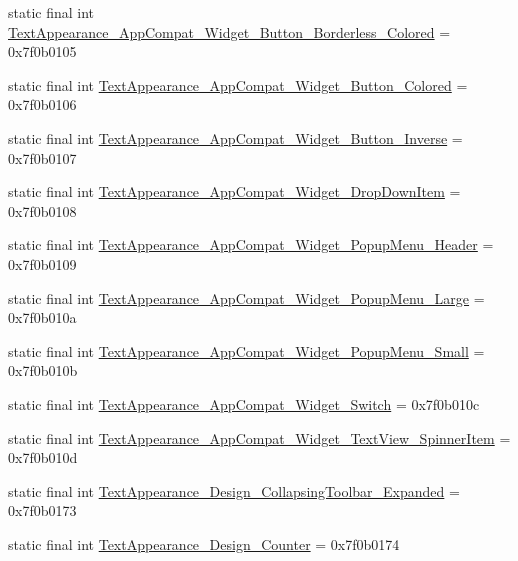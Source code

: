 \begin{CompactItemize}
\item 
static final int \hyperlink{classandroid_1_1support_1_1v7_1_1cardview_1_1_r_1_1style_46c04802bf8bde0a3ba1dcdb5ab0f161}{TextAppearance\_\-AppCompat\_\-Widget\_\-Button\_\-Borderless\_\-Colored} = 0x7f0b0105
\item 
static final int \hyperlink{classandroid_1_1support_1_1v7_1_1cardview_1_1_r_1_1style_08aa6abb9d2c92405c95fcb7412792d5}{TextAppearance\_\-AppCompat\_\-Widget\_\-Button\_\-Colored} = 0x7f0b0106
\item 
static final int \hyperlink{classandroid_1_1support_1_1v7_1_1cardview_1_1_r_1_1style_085db6fb1ccc083bab7230623e091c08}{TextAppearance\_\-AppCompat\_\-Widget\_\-Button\_\-Inverse} = 0x7f0b0107
\item 
static final int \hyperlink{classandroid_1_1support_1_1v7_1_1cardview_1_1_r_1_1style_6613edd94e047a7c1abb5eeb475e8f1d}{TextAppearance\_\-AppCompat\_\-Widget\_\-DropDownItem} = 0x7f0b0108
\item 
static final int \hyperlink{classandroid_1_1support_1_1v7_1_1cardview_1_1_r_1_1style_7861d0b2829a8611732de2196616acc8}{TextAppearance\_\-AppCompat\_\-Widget\_\-PopupMenu\_\-Header} = 0x7f0b0109
\item 
static final int \hyperlink{classandroid_1_1support_1_1v7_1_1cardview_1_1_r_1_1style_f1f84fda4ce90921cd9ec88070ee449b}{TextAppearance\_\-AppCompat\_\-Widget\_\-PopupMenu\_\-Large} = 0x7f0b010a
\item 
static final int \hyperlink{classandroid_1_1support_1_1v7_1_1cardview_1_1_r_1_1style_df598c0ad7e00cf391c0d1a5c2ad560e}{TextAppearance\_\-AppCompat\_\-Widget\_\-PopupMenu\_\-Small} = 0x7f0b010b
\item 
static final int \hyperlink{classandroid_1_1support_1_1v7_1_1cardview_1_1_r_1_1style_5ea8d33d11d685e41e0d68add983700f}{TextAppearance\_\-AppCompat\_\-Widget\_\-Switch} = 0x7f0b010c
\item 
static final int \hyperlink{classandroid_1_1support_1_1v7_1_1cardview_1_1_r_1_1style_3f61086486a957b1470f8cfe12f9c2ee}{TextAppearance\_\-AppCompat\_\-Widget\_\-TextView\_\-SpinnerItem} = 0x7f0b010d
\item 
static final int \hyperlink{classandroid_1_1support_1_1v7_1_1cardview_1_1_r_1_1style_c22540dc2066a424ffe27a7d03401249}{TextAppearance\_\-Design\_\-CollapsingToolbar\_\-Expanded} = 0x7f0b0173
\item 
static final int \hyperlink{classandroid_1_1support_1_1v7_1_1cardview_1_1_r_1_1style_84a4883b5f56ace7a7b535f33ac27ac8}{TextAppearance\_\-Design\_\-Counter} = 0x7f0b0174

\end{CompactItemize}
